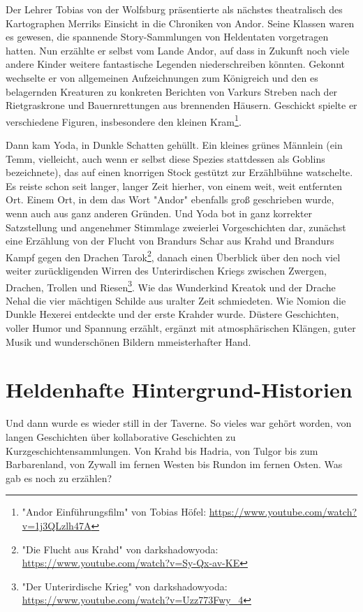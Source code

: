 Der Lehrer Tobias von der Wolfsburg präsentierte als nächstes theatralisch des Kartographen Merriks Einsicht in die Chroniken von Andor. Seine Klassen waren es gewesen, die spannende Story-Sammlungen von Heldentaten vorgetragen hatten. Nun erzählte er selbst vom Lande Andor, auf dass in Zukunft noch viele andere Kinder weitere fantastische Legenden niederschreiben könnten. Gekonnt wechselte er von allgemeinen Aufzeichnungen zum Königreich und den es belagernden Kreaturen zu konkreten Berichten von Varkurs Streben nach der Rietgraskrone und Bauernrettungen aus brennenden Häusern. Geschickt spielte er verschiedene Figuren, insbesondere den kleinen Kram\footnote{"Andor Einführungsfilm" von Tobias Höfel: \url{https://www.youtube.com/watch?v=1j3QLzlh47A}}.

Dann kam Yoda, in Dunkle Schatten gehüllt. Ein kleines grünes Männlein (ein Temm, vielleicht, auch wenn er selbst diese Spezies stattdessen als Goblins bezeichnete), das auf einen knorrigen Stock gestützt zur Erzählbühne watschelte. Es reiste schon seit langer, langer Zeit hierher, von einem weit, weit entfernten Ort. Einem Ort, in dem das Wort "Andor" ebenfalls groß geschrieben wurde, wenn auch aus ganz anderen Gründen. Und Yoda bot in ganz korrekter Satzstellung und angenehmer Stimmlage zweierlei Vorgeschichten dar, zunächst eine Erzählung von der Flucht von Brandurs Schar aus Krahd und Brandurs Kampf gegen den Drachen Tarok\footnote{"Die Flucht aus Krahd" von darkshadowyoda: \url{https://www.youtube.com/watch?v=Sy-Qx-av-KE}}, danach einen Überblick über den noch viel weiter zurückligenden Wirren des Unterirdischen Kriegs zwischen Zwergen, Drachen, Trollen und Riesen\footnote{"Der Unterirdische Krieg" von darkshadowyoda: \url{https://www.youtube.com/watch?v=Uzz773Fwy_4}}. Wie das Wunderkind Kreatok und der Drache Nehal die vier mächtigen Schilde aus uralter Zeit schmiedeten. Wie Nomion die Dunkle Hexerei entdeckte und der erste Krahder wurde. Düstere Geschichten, voller Humor und Spannung erzählt, ergänzt mit atmosphärischen Klängen, guter Musik und wunderschönen Bildern mmeisterhafter Hand.



\newpage
\section{Heldenhafte Hintergrund-Historien}


Und dann wurde es wieder still in der Taverne. So vieles war gehört worden, von langen Geschichten über kollaborative Geschichten zu Kurzgeschichtensammlungen. Von Krahd bis Hadria, von Tulgor bis zum Barbarenland, von Zywall im fernen Westen bis Rundon im fernen Osten. Was gab es noch zu erzählen?

